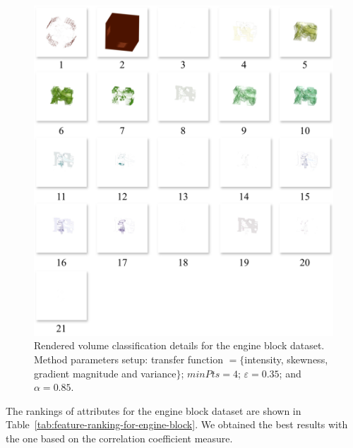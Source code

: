 \begin{figure}[htb!]
    \centering
    \includegraphics[width=\columnwidth]{figs/engine-block-clusters.jpg}
    \caption{Rendered volume classification details for the engine block dataset. Method parameters setup: transfer function  $=\{$intensity, skewness, gradient magnitude and variance$\}$; $minPts = 4$; $\varepsilon = 0.35$; and $\alpha = 0.85$.}
    \label{fig:engine-block-clusters}
\end{figure}

The rankings of attributes for the engine block dataset are shown in Table~\ref{tab:feature-ranking-for-engine-block}. We obtained the best results with the one based on the correlation coefficient measure.

